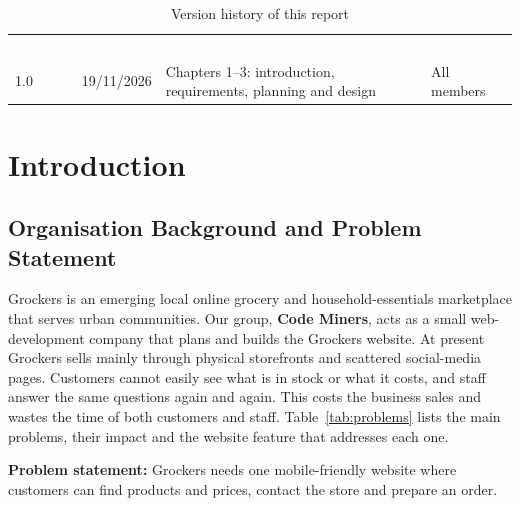 \documentclass[10pt,a4paper]{article}
\newcommand{\hc}[1]{\textcolor{white}{\bfseries #1}}
\newcommand{\tbl}{\rowcolors{2}{white}{gkbg}\renewcommand{\arraystretch}{1.2}\footnotesize}
\begin{document}
\begin{table}[H]
\centering
\caption{Version history of this report}
\tbl
\begin{tabularx}{\textwidth}{@{}llYl@{}}
\hc{Version} & \hc{Date} & \hc{Changes} & \hc{Author(s)}\\
1.0 & 19/11/2026 & Chapters 1--3: introduction, requirements, planning and design & All members\\
\end{tabularx}
\end{table}

\begingroup
\renewcommand{\contentsname}{Contents}
\small
\tableofcontents
\endgroup

\section{Introduction}

\subsection{Organisation Background and Problem Statement}
Grockers is an emerging local online grocery and household-essentials marketplace that serves urban communities. Our group, \textbf{Code Miners}, acts as a small web-development company that plans and builds the Grockers website. At present Grockers sells mainly through physical storefronts and scattered social-media pages. Customers cannot easily see what is in stock or what it costs, and staff answer the same questions again and again. This costs the business sales and wastes the time of both customers and staff. Table~\ref{tab:problems} lists the main problems, their impact and the website feature that addresses each one.

\textbf{Problem statement:} Grockers needs one mobile-friendly website where customers can find products and prices, contact the store and prepare an order.
\end{document}
